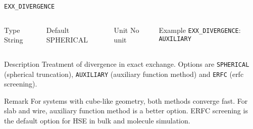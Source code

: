 \begin{frame}[allowframebreaks]{\texttt{EXX\_DIVERGENCE}} \label{EXX_DIVERGENCE}
\vspace*{-12pt}
\begin{columns}
\begin{block}{Type}
String
\end{block}

\begin{block}{Default}
SPHERICAL
\end{block}

\begin{block}{Unit}
No unit
\end{block}

\begin{block}{Example}
\texttt{EXX\_DIVERGENCE}: \texttt{AUXILIARY}
\end{block}
\end{columns}

\begin{block}{Description}
Treatment of divergence in exact exchange. Options are \texttt{SPHERICAL} (spherical truncation), 
\texttt{AUXILIARY} (auxiliary function method) and \texttt{ERFC} (erfc screening).
\end{block}

\begin{block}{Remark}
For systems with cube-like geometry, both methods converge fast. For slab and wire, auxiliary function method is a better option. 
ERFC screening is the default option for HSE in bulk and molecule simulation.
\end{block}

\end{frame}
